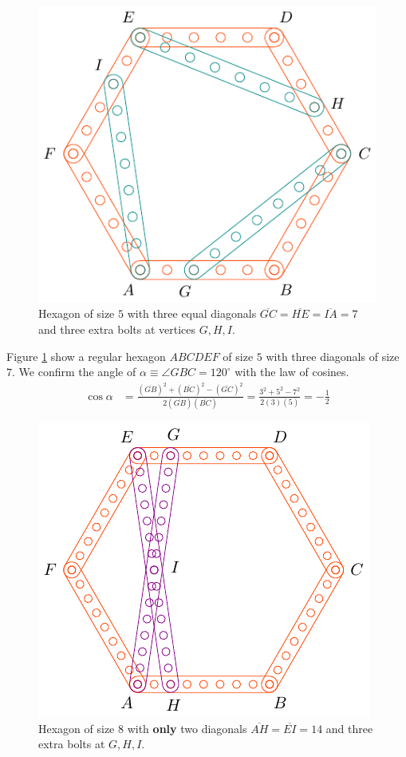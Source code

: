 \documentclass[11pt]{article}
\begin{document}
\begin{figure}[H]
\centering
\includegraphics[scale=1]{5/hexa-5a}
\caption{Hexagon of size $5$ with three equal diagonals $\overline{GC} = \overline{HE} = \overline{IA} = 7$ and three extra bolts at vertices $G,H,I$.}
\label{fig:5a}
\end{figure}

Figure \ref{fig:5a} show a regular hexagon $ABCDEF$ of size $5$ with three diagonals of size $7$. We confirm the angle of $\alpha \equiv \angle{GBC} = 120^\circ$ with the law of cosines.
\begin{align}
\cos\alpha &= \frac{(\overline{GB})^2 + (\overline{BC})^2 - (\overline{GC})^2}
 {2(\overline{GB})(\overline{BC})}
 = \frac{3^2 + 5^2 - 7^2}{2(3)(5)} = -\frac{1}2 \nonumber
\end{align}

\begin{figure}[H]
\centering
\includegraphics[scale=1]{8/hexa-8a}
\caption{Hexagon of size $8$ with \textbf{only} two diagonals $\overline{AH} = \overline{EI} = 14$ and three extra bolts at $G,H,I$.}
\label{fig:8a}
\end{figure}
\end{document}
